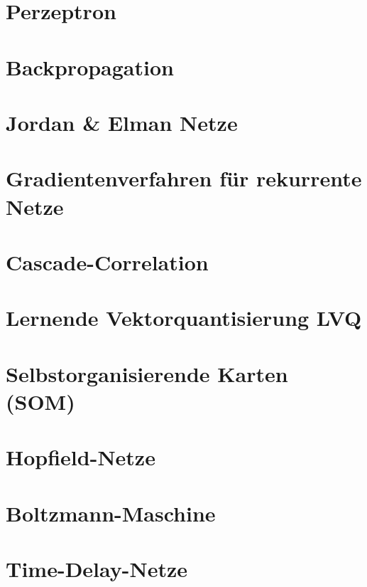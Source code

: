 \documentclass[fleqn,10pt]{SelfArx} %
\begin{document}
\section{Perzeptron}


\section{Backpropagation}


\section{Jordan \& Elman Netze}


\section{Gradientenverfahren für rekurrente Netze}


\section{Cascade-Correlation}


\section{Lernende Vektorquantisierung LVQ}


\section{Selbstorganisierende Karten (SOM)}


\section{Hopfield-Netze}


\section{Boltzmann-Maschine}


\section{Time-Delay-Netze}

\end{document}
